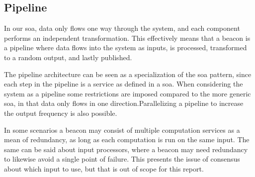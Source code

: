 \subsection{Pipeline}%
\label{sub:pipeline}
In our \gls{soa}, data only flows one way through the system, and each component performs an independent transformation.
This effectively means that a beacon is a pipeline where data flows into the system as inputs, is processed, transformed to a random output, and lastly published.

The pipeline architecture can be seen as a specialization of the \gls{soa} pattern, since each step in the pipeline is a service as defined in a \gls{soa}.
When considering the system as a pipeline some restrictions are imposed compared to the more generic \gls{soa}, in that data only flows in one direction.Parallelizing a pipeline to increase the output frequency is also possible.

In some scenarios a beacon may consist of multiple computation services as a mean of redundancy, as long as each computation is run on the same input.
The same can be said about input processors, where a beacon may need redundancy to likewise avoid a single point of failure.
This presents the issue of consensus about which input to use, but that is out of scope for this report.



